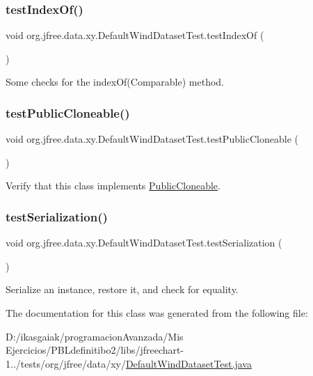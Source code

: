 \subsubsection{\texorpdfstring{test\+Index\+Of()}{testIndexOf()}}
{\footnotesize\ttfamily void org.\+jfree.\+data.\+xy.\+Default\+Wind\+Dataset\+Test.\+test\+Index\+Of (\begin{DoxyParamCaption}{ }\end{DoxyParamCaption})}

Some checks for the index\+Of(\+Comparable) method. \mbox{\label{classorg_1_1jfree_1_1data_1_1xy_1_1_default_wind_dataset_test_ae27efdcae80a0b05325d29e5b90580a1}} 
\subsubsection{\texorpdfstring{test\+Public\+Cloneable()}{testPublicCloneable()}}
{\footnotesize\ttfamily void org.\+jfree.\+data.\+xy.\+Default\+Wind\+Dataset\+Test.\+test\+Public\+Cloneable (\begin{DoxyParamCaption}{ }\end{DoxyParamCaption})}

Verify that this class implements \mbox{\hyperlink{}{Public\+Cloneable}}. \mbox{\label{classorg_1_1jfree_1_1data_1_1xy_1_1_default_wind_dataset_test_af7359322d733fc31f7e4b0d6961b5f5d}} 
\subsubsection{\texorpdfstring{test\+Serialization()}{testSerialization()}}
{\footnotesize\ttfamily void org.\+jfree.\+data.\+xy.\+Default\+Wind\+Dataset\+Test.\+test\+Serialization (\begin{DoxyParamCaption}{ }\end{DoxyParamCaption})}

Serialize an instance, restore it, and check for equality. 

The documentation for this class was generated from the following file\+:\begin{DoxyCompactItemize}
\item 
D\+:/ikasgaiak/programacion\+Avanzada/\+Mis Ejercicios/\+P\+B\+Ldefinitibo2/libs/jfreechart-\/1../tests/org/jfree/data/xy/\mbox{\hyperlink{_default_wind_dataset_test_8java}{Default\+Wind\+Dataset\+Test.\+java}}\end{DoxyCompactItemize}
